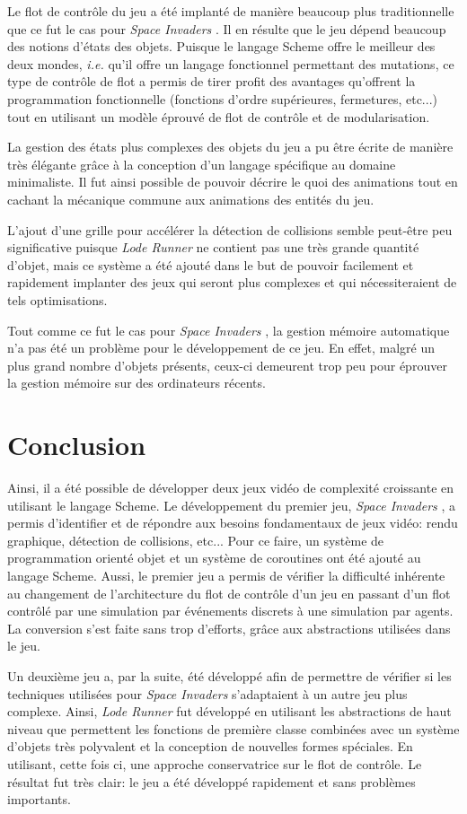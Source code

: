 \documentclass[12pt,oneside,letterpaper,francais]{book}
\newcommand{\ie}{{\textit{i.e. }}}
\newcommand{\lr}{{\textit{Lode Runner }}}
\newcommand{\si}{{\textit{Space Invaders }}}
\begin{document}
Le flot de contrôle du jeu a été implanté de manière beaucoup plus
traditionnelle que ce fut le cas pour \si. Il en résulte que le jeu
dépend beaucoup des notions d'états des objets. Puisque le langage
Scheme offre le meilleur des deux mondes, \ie qu'il offre un langage
fonctionnel permettant des mutations, ce type de contrôle de flot a
permis de tirer profit des avantages qu'offrent la programmation
fonctionnelle (fonctions d'ordre supérieures, fermetures, etc...) tout
en utilisant un modèle éprouvé de flot de contrôle et de
modularisation.

La gestion des états plus complexes des objets du jeu a pu être écrite
de manière très élégante grâce à la conception d'un langage spécifique
au domaine minimaliste. Il fut ainsi possible de pouvoir décrire le
\og quoi \fg des animations tout en cachant la mécanique commune aux
animations des entités du jeu.

L'ajout d'une grille pour accélérer la détection de collisions semble
peut-être peu significative puisque \lr ne contient pas une très
grande quantité d'objet, mais ce système a été ajouté dans le but de
pouvoir facilement et rapidement implanter des jeux qui seront plus
complexes et qui nécessiteraient de tels optimisations.

Tout comme ce fut le cas pour \si, la gestion mémoire automatique n'a
pas été un problème pour le développement de ce jeu. En effet, malgré
un plus grand nombre d'objets présents, ceux-ci demeurent trop peu
pour éprouver la gestion mémoire sur des ordinateurs récents.

\section{Conclusion}
Ainsi, il a été possible de développer deux jeux vidéo de complexité
croissante en utilisant le langage Scheme. Le développement du premier
jeu, \si, a permis d'identifier et de répondre aux besoins
fondamentaux de jeux vidéo: rendu graphique, détection de collisions,
etc... Pour ce faire, un système de programmation orienté objet et un
système de coroutines ont été ajouté au langage Scheme. Aussi, le
premier jeu a permis de vérifier la difficulté inhérente au changement
de l'architecture du flot de contrôle d'un jeu en passant d'un flot
contrôlé par une simulation par événements discrets à une simulation
par agents. La conversion s'est faite sans trop d'efforts, grâce aux
abstractions utilisées dans le jeu.

Un deuxième jeu a, par la suite, été développé afin de permettre de
vérifier si les techniques utilisées pour \si s'adaptaient à un autre
jeu plus complexe. Ainsi, \lr fut développé en utilisant les
abstractions de haut niveau que permettent les fonctions de première
classe combinées avec un système d'objets très polyvalent et la
conception de nouvelles formes spéciales. En utilisant, cette fois ci,
une approche conservatrice sur le flot de contrôle. Le résultat fut
très clair: le jeu a été développé rapidement et sans problèmes
importants.
\end{document}
